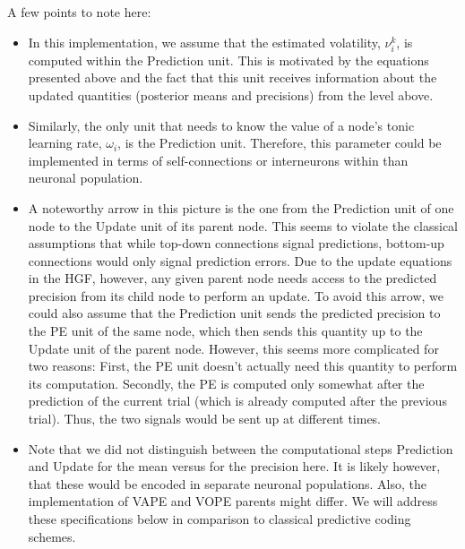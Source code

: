 A few points to note here:
\begin{itemize}
\item In this implementation, we assume that the estimated volatility, $\nu_i^{k}$, is computed within the \textsf{Prediction} unit. This is motivated by the equations presented above and the fact that this unit receives information about the updated quantities (posterior means and precisions) from the level above.
\item Similarly, the only unit that needs to know the value of a node's tonic learning rate, $\omega_i$, is the \textsf{Prediction} unit. Therefore, this parameter could be implemented in terms of self-connections or interneurons within than neuronal population.
\item A noteworthy arrow in this picture is the one from the \textsf{Prediction} unit of one node to the \textsf{Update} unit of its parent node. This seems to violate the classical assumptions that while top-down connections signal predictions, bottom-up connections would only signal prediction errors. Due to the update equations in the HGF, however, any given parent node needs access to the predicted precision from its child node to perform an update. To avoid this arrow, we could also assume that the \textsf{Prediction} unit sends the predicted precision to the \textsf{PE} unit of the same node, which then sends this quantity up to the \textsf{Update} unit of the parent node. However, this seems more complicated for two reasons: First, the \textsf{PE} unit doesn't actually need this quantity to perform its computation. Secondly, the PE is computed only somewhat after the prediction of the current trial (which is already computed after the previous trial). Thus, the two signals would be sent up at different times.
\item Note that we did not distinguish between the computational steps \textsf{Prediction} and \textsf{Update} for the mean versus for the precision here. It is likely however, that these would be encoded in separate neuronal populations. Also, the implementation of VAPE and VOPE parents might differ. We will address these specifications below in comparison to classical predictive coding schemes.
\end{itemize}
